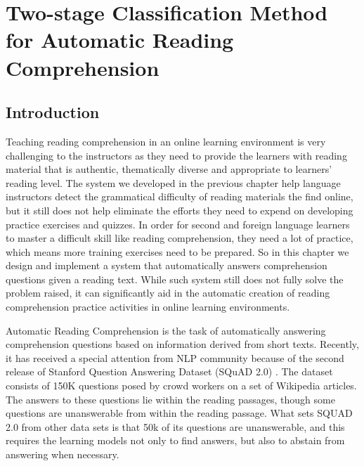 
\chapter{Two-stage Classification Method for Automatic Reading Comprehension } %

\label{Chapter3} %

\section{Introduction}

Teaching reading comprehension in an online learning environment is very challenging to the instructors as they need to provide the learners with reading material that is authentic, thematically diverse and appropriate to learners' reading level. The system we developed in the previous chapter help language instructors detect the grammatical difficulty of reading materials the find online, but it still does not help eliminate the efforts they need to expend on developing practice exercises and quizzes. In order for second and foreign language learners to master a difficult skill like reading comprehension, they need a lot of practice, which means more training exercises need to be prepared. So in this chapter we design and implement a system that automatically answers comprehension questions given a reading text. While such system still does not fully solve the problem raised, it can significantly aid in the automatic creation of reading comprehension practice activities in online learning environments. 

Automatic Reading Comprehension is the task of automatically answering comprehension questions based on information derived from short texts. Recently, it has received a special attention from NLP community because of the second release of Stanford Question Answering Dataset (SQuAD 2.0) \citep{rajpurkar2018know}. The dataset consists of 150K questions posed by crowd workers on a set of Wikipedia articles. The answers to these questions lie within the reading passages, though some questions are unanswerable from within the reading passage. What sets SQUAD 2.0 from other data sets is that 50k of its questions are unanswerable, and this requires the learning models not only to find answers, but also to abstain from answering when necessary. \\

